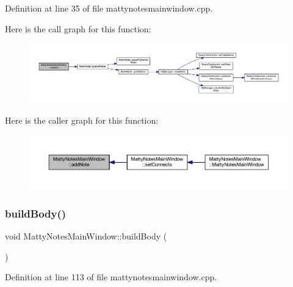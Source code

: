 Definition at line 35 of file mattynotesmainwindow.\+cpp.

Here is the call graph for this function\+:
\nopagebreak
\begin{figure}[H]
\begin{center}
\leavevmode
\includegraphics[width=350pt]{classMattyNotesMainWindow_af77c5a79f0a941dbb980776df6a8b1eb_cgraph}
\end{center}
\end{figure}
Here is the caller graph for this function\+:
\nopagebreak
\begin{figure}[H]
\begin{center}
\leavevmode
\includegraphics[width=350pt]{classMattyNotesMainWindow_af77c5a79f0a941dbb980776df6a8b1eb_icgraph}
\end{center}
\end{figure}
\hypertarget{classMattyNotesMainWindow_af75387f6dfa1be40552c54a91795d196}{}\label{classMattyNotesMainWindow_af75387f6dfa1be40552c54a91795d196} 
\subsubsection{\texorpdfstring{build\+Body()}{buildBody()}}
{\footnotesize\ttfamily void Matty\+Notes\+Main\+Window\+::build\+Body (\begin{DoxyParamCaption}{ }\end{DoxyParamCaption})\hspace{0.3cm}{\ttfamily [private]}}



Definition at line 113 of file mattynotesmainwindow.\+cpp.

